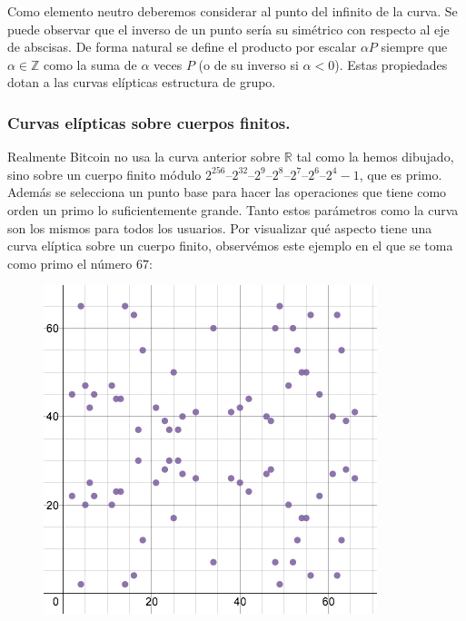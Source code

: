 \documentclass[twoside]{article}
\theoremstyle{definition}
\newcommand{\R}{\mathbb{R}}
\newcommand{\Z}{\mathbb{Z}}
\begin{document}
Como elemento neutro deberemos considerar al punto del infinito de la curva. Se puede observar que el inverso de un punto sería su simétrico con respecto al eje de abscisas. De forma natural se define el producto por escalar $\alpha P$ siempre que $\alpha\in\Z$ como la suma de $\alpha$ veces $P$ (o de su inverso si $\alpha<0$). Estas propiedades dotan a las curvas elípticas estructura de grupo.

\subsubsection{Curvas elípticas sobre cuerpos finitos.} 
Realmente Bitcoin no usa la curva anterior sobre $\R$ tal como la hemos dibujado, sino sobre un cuerpo finito módulo $2^{256} – 2^{32} – 2^9 – 2^8 – 2^7 – 2^6 – 2^4 - 1$, que es primo. Además se selecciona un punto base para hacer las operaciones que tiene como orden un primo lo suficientemente grande. Tanto estos parámetros como la curva son los mismos para todos los usuarios. Por visualizar qué aspecto tiene una curva elíptica sobre un cuerpo finito, observémos este ejemplo en el que se toma como primo el número $67$:
\begin{figure}[h!]
\includegraphics[scale=0.38]{field}
\end{figure}

\newpage
\end{document}
